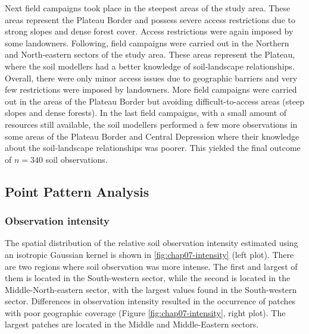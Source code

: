 Next field campaigns took place in the steepest areas of the study area. These areas represent the Plateau 
Border and possess severe access restrictions due to strong slopes and dense forest cover. Access restrictions 
were again imposed by some landowners. Following, field campaigns were carried out in the Northern and 
North-eastern sectors of the study area. These areas represent the Plateau, where the soil modellers had a 
better knowledge of soil-landscape relationships. Overall, there were only minor access issues due to 
geographic barriers and very few restrictions were imposed by landowners. More field campaigns were carried 
out in the areas of the Plateau Border but avoiding difficult-to-access areas (steep slopes and dense forests).
In the last field campaigns, with a small amount of resources still available, the soil modellers performed a 
few more observations in some areas of the Plateau Border and Central Depression where their knowledge about 
the soil-landscape relationships was poorer. This yielded the final outcome of $n = 340$ soil observations.

\subsection{Point Pattern Analysis}

\subsubsection{Observation intensity}

The spatial distribution of the relative soil observation intensity estimated using an isotropic Gaussian 
kernel is shown in \autoref{fig:chap07-intensity} (left plot). There are two regions where soil observation 
was more intense. The first and largest of them is located in the South-western sector, while the second is 
located in the Middle-North-eastern sector, with the largest values found in the South-western sector. 
Differences in observation intensity resulted in the occurrence of patches with poor geographic coverage 
(Figure \ref{fig:chap07-intensity}, right plot). The largest patches are located in the Middle and 
Middle-Eastern sectors.

